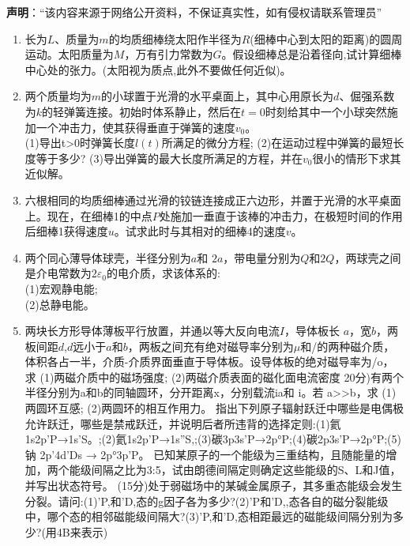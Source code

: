 

\textbf{声明}：“该内容来源于网络公开资料，不保证真实性，如有侵权请联系管理员”

\begin{enumerate}
\item 长为$L$、质量为$m$的均质细棒绕太阳作半径为$R$(细棒中心到太阳的距离)的圆周运动。太阳质量为$M$，万有引力常数为$G$。假设细棒总是沿着径向,试计算细棒中心处的张力。(太阳视为质点,此外不要做任何近似)。
\item 两个质量均为$m$的小球置于光滑的水平桌面上，其中心用原长为$d$、倔强系数为$k$的轻弹簧连接。初始时体系静止，然后在$t=0$时刻给其中一个小球突然施加一个冲击力，使其获得垂直于弹簧的速度$v_0$。\\
(1)导出t>0时弹簧长度$l(t)$所满足的微分方程;
(2)在运动过程中弹簧的最短长度等于多少?
(3)导出弹簧的最大长度所满足的方程，并在$v_0$很小的情形下求其近似解。
\item 六根相同的均质细棒通过光滑的铰链连接成正六边形，并置于光滑的水平桌面上。现在，在细棒1的中点$P$处施加一垂直于该棒的冲击力，在极短时间的作用后细棒1获得速度$u$。试求此时与其相对的细棒4的速度$v$。
\item 两个同心薄导体球壳，半径分别为$a$和 $2a$，带电量分别为$Q$和$2Q$，两球壳之间是介电常数为$2\varepsilon_0$的电介质，求该体系的:\\
(1)宏观静电能;\\
(2)总静电能。
\item 两块长方形导体薄板平行放置，并通以等大反向电流$I$，导体板长 $a$，宽$b$，两板间距$d$,$d$远小于$a$和$b$，两板之间充有绝对磁导率分别为$\mu$和/的两种磁介质，体积各占一半，介质-介质界面垂直于导体板。设导体板的绝对磁导率为/o，求
(1)两磁介质中的磁场强度;
(2)两磁介质表面的磁化面电流密度
20分)有两个半径分别为a和b的同轴圆环，分开距离x，分别载流ia和 i。若 a>>b，求
(1)两圆环互感;
(2)两圆环的相互作用力。
指出下列原子辐射跃迁中哪些是电偶极允许跃迁，哪些是禁戒跃迁，并说明后者所违背的选择定则:(1)氦1s2p'P→1s'S。;(2)氦1s2p’P→1s''S,;(3)碳3p3s’P→2p°P;(4)碳2p3s’P→2p°P;(5)钠 2p'4d’Ds → 2p°3p’P。
已知某原子的一个能级为三重结构，且随能量的增加，两个能级间隔之比为3:5，试由朗德间隔定则确定这些能级的S、L和J值，并写出状态符号。
(15分)处于弱磁场中的某碱金属原子，其多重态能级会发生分裂。请问:(1)'P,和'D,态的g因子各为多少?(2)'P和'D,,态各自的磁分裂能级中，哪个态的相邻磁能级间隔大?(3)’P,和'D,态相距最远的磁能级间隔分别为多少?(用4B来表示)

\end{enumerate}